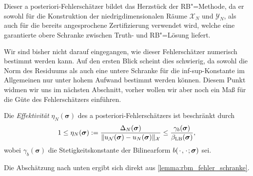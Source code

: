 \documentclass[../main.tex]{subfiles}
\begin{document}
Dieser a posteriori-Fehlerschätzer bildet das Herzstück der RB"=Methode, da er sowohl für die Konstruktion der niedrigdimensionalen Räume $\mathcal X_{N}$ und $\mathcal Y_{N}$, als auch für die bereits angesprochene Zertifizierung verwendet wird, welche eine garantierte obere Schranke zwischen Truth- und RB"=Lösung liefert.

Wir sind bisher nicht darauf eingegangen, wie dieser Fehlerschätzer numerisch bestimmt werden kann.
Auf den ersten Blick scheint dies schwierig, da sowohl die Norm des Residuums als auch eine untere Schranke für die inf-sup-Konstante im Allgemeinen nur unter hohem Aufwand bestimmt werden können.
Diesem Punkt widmen wir uns im nächsten Abschnitt, vorher wollen wir aber noch ein Maß für die Güte des Fehlerschätzers einführen.

\begin{Lemma}
\label{lemma:effektivitaet}
    Die \emph{Effektivität} $\eta_{N}(\bm \sigma)$ des a posteriori-Fehlerschätzers ist beschränkt durch
    \begin{equation}
        1 \leq \eta_{N}(\bm \sigma) := \frac{\Delta_{N}(\bm \sigma)}{\lVert u_{\mathcal N}(\bm \sigma) - u_{N}(\bm \sigma)\rVert_{\mathcal X}} \leq \frac{\gamma_{b}(\bm \sigma)}{\beta_{\mathrm{LB}}(\bm \sigma)},
    \end{equation}
    wobei $\gamma_{b}(\bm \sigma)$ die Stetigkeitskonstante der Bilinearform $b({\mkern2mu\cdot\mkern2mu}, {\mkern2mu\cdot\mkern2mu}; \bm \sigma)$ sei.

    \begin{Beweis}
        Die Abschätzung nach unten ergibt sich direkt aus \cref{lemma:rbm_fehler_schranke}.


\end{Beweis}
\end{Lemma}
\end{document}
